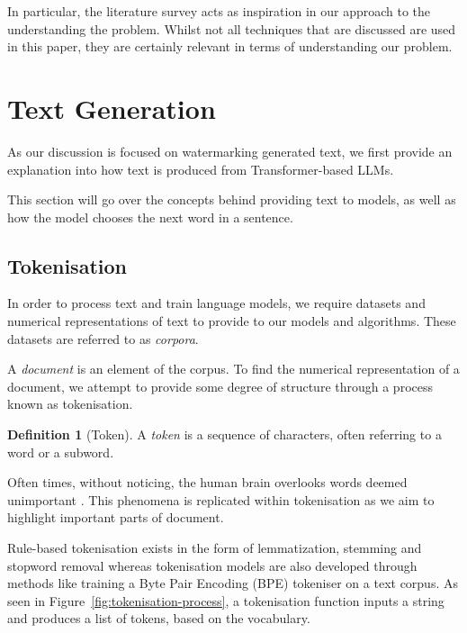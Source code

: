 \documentclass{l4proj}
\theoremstyle{definition}
\newtheorem{definition}{Definition}[section]
\begin{document}
In particular, the literature survey acts as inspiration in our approach to the understanding the problem. Whilst not all techniques that are discussed are used in this paper, they are certainly relevant in terms of understanding our problem.

\section{Text Generation}
    As our discussion is focused on watermarking generated text, we first provide an explanation into how text is produced from Transformer-based LLMs.

    This section will go over the concepts behind providing text to models, as well as how the model chooses the next word in a sentence.
    
    \subsection{Tokenisation}
        In order to process text and train language models, we require datasets and numerical representations of text to provide to our models and algorithms. These datasets are referred to as \emph{corpora}.

        A \emph{document} is an element of the corpus.
        To find the numerical representation of a document, we attempt to provide some degree of structure through a process known as tokenisation.

        \begin{definition}[Token]
            A \emph{token} is a sequence of characters, often referring to a word or a subword.
        \end{definition}

        Often times, without noticing, the human brain overlooks words deemed unimportant \citep{Rayner2011-pk}. This phenomena is replicated within tokenisation as we aim to highlight important parts of document.

        Rule-based tokenisation exists in the form of lemmatization, stemming and stopword removal whereas tokenisation models are also developed through methods like training a Byte Pair Encoding (BPE) tokeniser \citep{Gage1994ANA, sennrich2016neural} on a text corpus. As seen in Figure~\ref{fig:tokenisation-process}, a tokenisation function inputs a string and produces a list of tokens, based on the vocabulary. 
        
\end{document}
